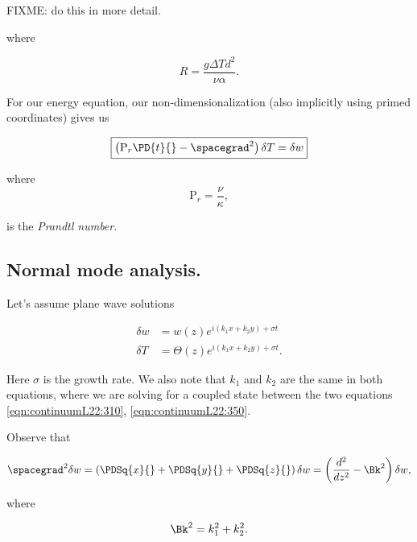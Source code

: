 FIXME: do this in more detail.

where

\begin{equation}\label{eqn:continuumL22:330}
R = \frac{g \Delta T d^2}{\nu \alpha}.
\end{equation}

For our energy equation, our non-dimensionalization (also implicitly using primed coordinates) gives us

\begin{equation}\label{eqn:continuumL22:350}
\boxed{
\left( 
\text{P}_r
\PD{t}{} - \spacegrad^2 \right) \delta T = \delta w
}
\end{equation}

where 
\begin{equation}\label{eqn:continuumL22:370}
\text{P}_r = \frac{\nu}{\kappa},
\end{equation}

is the \textit{Prandtl number}.

\subsection{Normal mode analysis.}

Let's assume plane wave solutions

\begin{align}\label{eqn:continuumL22:390}
\delta w &= w(z) e^{ i ( k_1 x + k_2 y) + \sigma t} \\
\delta T &= \Theta(z) e^{ i ( k_1 x + k_2 y) + \sigma t}.
\end{align}

Here $\sigma$ is the growth rate.  We also note that $k_1$ and $k_2$ are the same in both equations, where we are solving for a coupled state between the two equations \ref{eqn:continuumL22:310}, \ref{eqn:continuumL22:350}.

%

Observe that 

\begin{equation}\label{eqn:continuumL22:410}
\spacegrad^2 \delta w 
= 
\left( 
\PDSq{x}{}
+\PDSq{y}{}
+\PDSq{z}{}
\right) \delta w
=
\left( \frac{d^2}{dz^2} - \Bk^2 \right) \delta w,
\end{equation}

where 

\begin{equation}\label{eqn:continuumL22:430}
\Bk^2 = k_1^2 + k_2^2.
\end{equation}

